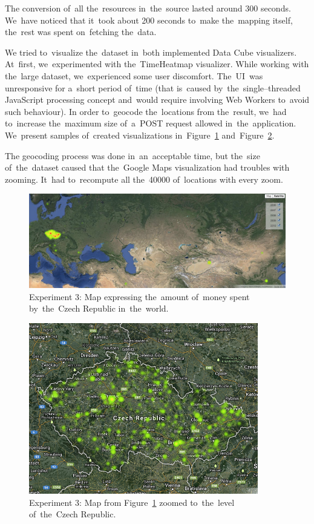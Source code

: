The conversion of~all the~resources in~the~source lasted around 300 seconds. We~have noticed that it~took about 200 seconds to~make the~mapping itself, the~rest 
was spent on~fetching the~data.

We tried to~visualize the~dataset in~both implemented Data Cube visualizers. At~first, we~experimented 
with the~TimeHeatmap visualizer. While working with the~large dataset, we~experienced some user discomfort. The~UI~was unresponsive for a~short period of~time
(that is~caused by~the~single--threaded JavaScript processing concept and~would require
involving Web Workers to~avoid such behaviour). 
In order to~geocode the~locations from the~result, we~had to~increase the~maximum size of~a~POST request allowed in~the~application. We~present samples of~created visualizations in~Figure~\ref{fig:contracts-map-world} and~Figure~\ref{fig:contracts-map-zoomed}.

\begin{sloppypar}
The geocoding process was done in~an~acceptable time, but the~size of~the~dataset caused that the~Google Maps visualization had troubles with zooming. It~had to~recompute all the~40000 of~locations with every zoom.
\end{sloppypar}

\begin{figure}
  \centering
  \includegraphics[width=140mm]{img/contracts-map-world.png}
  \caption{Experiment 3: Map expressing the~amount of~money spent by~the~Czech Republic in~the~world.}
  \label{fig:contracts-map-world}
\end{figure}

\begin{figure}
  \centering
  \includegraphics[width=100mm]{img/contracts-map-zoomed.png}
  \caption{Experiment 3: Map from Figure~\ref{fig:contracts-map-world} zoomed to~the~level of~the~Czech Republic.}
  \label{fig:contracts-map-zoomed}
\end{figure}

